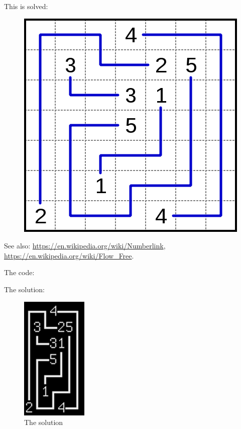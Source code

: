 This is solved:

\begin{figure}[H]
\centering
\includegraphics[scale=0.3]{puzzles/numberlink/Z3/424px-Numberlink_puzzle_solution.svg.png}
\caption{}
\end{figure}

See also:
\url{https://en.wikipedia.org/wiki/Numberlink},
\url{https://en.wikipedia.org/wiki/Flow_Free}.

The code:



The solution:



\begin{figure}[H]
\centering
\includegraphics[scale=1]{puzzles/numberlink/Z3/solution.png}
\caption{The solution}
\end{figure}

